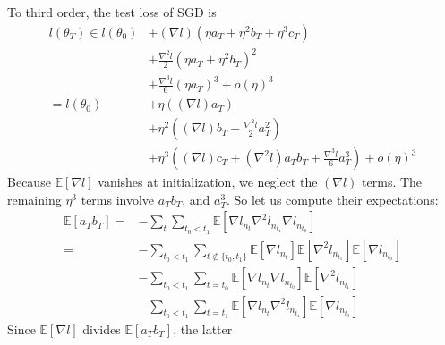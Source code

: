 \documentclass{article}
\theoremstyle{plain}
\theoremstyle{definition}
\newcommand{\wrap}[1]{\left(#1\right)}
\newcommand{\expct}[1]{\mathbb{E}\left[#1\right]}
\begin{document}
\begin{shaded}
            To third order, the test loss of SGD is
            \begin{align*}
                l(\theta_T)
                \in
                        l(\theta_0)
                &+     (\nabla   l)   (\eta a_T + \eta^2 b_T + \eta^3 c_T)                              \\
                &+\frac{\nabla^2 l}{2}(\eta a_T + \eta^2 b_T             )^2                            \\
                &+\frac{\nabla^3 l}{6}(\eta a_T                          )^3 
                 +o(\eta)^3                                                                             \\
                =
                    l(\theta_0)
                &+  \eta       \wrap{(\nabla l) a_T                               }                     \\
                &+  \eta^2     \wrap{(\nabla l) b_T + \frac{\nabla^2 l}{2} a_T^2  }                     \\
                &+  \eta^3     \wrap{(\nabla l) c_T + (\nabla^2 l) a_T b_T + \frac{\nabla^3 l}{6} a_T^3}
                 +o(\eta)^3                                                                             
            \end{align*}
            Because $\expct{\nabla l}$ vanishes at initialization, we neglect
            the $(\nabla l)$ terms.  The remaining $\eta^3$ terms involve
            $a_T b_T$, and $a_T^3$.  So let us
            compute their expectations:
            \begin{align*}
                \expct{a_T b_T}
                    =&- \sum_{t} \sum_{t_0 < t_1}
                        \expct{\nabla l_{n_t} \nabla^2 l_{n_{t_1}} \nabla l_{n_{t_0}}}
                    \\
                    =&- \sum_{t_0 < t_1}  
                        \sum_{t \notin \{t_0, t_1\}} 
                            \expct{\nabla l_{n_t}} \expct{\nabla^2 l_{n_{t_1}}} \expct{\nabla l_{n_{t_0}}}
                    \\&- \sum_{t_0 < t_1}  
                        \sum_{t = t_0}
                            \expct{\nabla l_{n_t} \nabla l_{n_{t_0}}} \expct{\nabla^2 l_{n_{t_1}}}
                    \\&- \sum_{t_0 < t_1}  
                        \sum_{t = t_1}
                            \expct{\nabla l_{n_t} \nabla^2 l_{n_{t_1}}} \expct{\nabla l_{n_{t_0}}}
            \end{align*}
            Since $\expct{\nabla l}$ divides $\expct{a_T b_T}$, the latter

\end{shaded}
\end{document}
